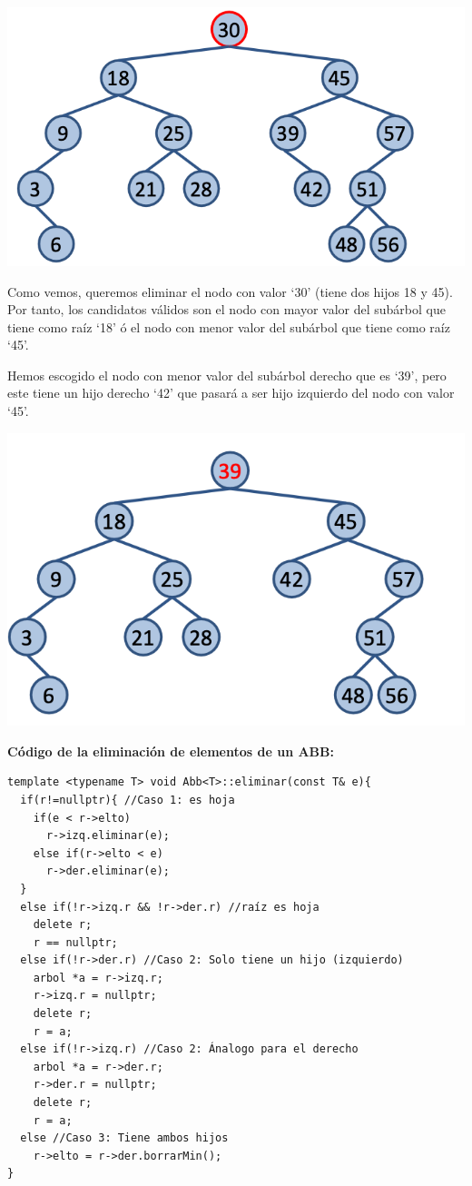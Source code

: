 \begin{itemize}
  \begin{minipage}{0.4\textwidth}
    \includegraphics[width=\textwidth]{assets/abb8.png}
  \end{minipage}
  \hfill
  \begin{minipage}{0.5\textwidth}
  Como vemos, queremos eliminar el nodo con valor `30' (tiene dos hijos 18 y 45). Por tanto, los candidatos válidos son el nodo con mayor valor del subárbol que tiene como raíz `18' ó el nodo con menor valor del subárbol que tiene como raíz `45'.

  Hemos escogido el nodo con menor valor del subárbol derecho que es `39', pero este tiene un hijo derecho `42' que pasará a ser hijo izquierdo del nodo con valor `45'.
  \end{minipage}
  \begin{center}
    \includegraphics[width=.4\textwidth]{assets/abb9.png}
  \end{center}
\end{itemize}

\textbf{Código de la eliminación de elementos de un ABB:}
\begin{verbatim}
template <typename T> void Abb<T>::eliminar(const T& e){
  if(r!=nullptr){ //Caso 1: es hoja
    if(e < r->elto)
      r->izq.eliminar(e);
    else if(r->elto < e)
      r->der.eliminar(e);
  }
  else if(!r->izq.r && !r->der.r) //raíz es hoja
    delete r;
    r == nullptr;
  else if(!r->der.r) //Caso 2: Solo tiene un hijo (izquierdo)
    arbol *a = r->izq.r;
    r->izq.r = nullptr;
    delete r;
    r = a;
  else if(!r->izq.r) //Caso 2: Ánalogo para el derecho
    arbol *a = r->der.r;
    r->der.r = nullptr;
    delete r;
    r = a;
  else //Caso 3: Tiene ambos hijos
    r->elto = r->der.borrarMin();
}
\end{verbatim}
